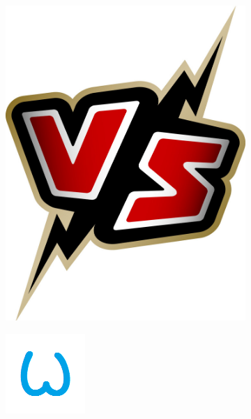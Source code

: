 \documentclass{beamer}
\begin{document}
\begin{frame}
\begin{minipage}{\textwidth}
\begin{figure}
\begin{subfigure}[b]{0.2\textwidth}
			\includegraphics[width=\textwidth]{versus.jpg}
			\label{fig:nodsdfsde_mcudf}
		\end{subfigure}
		\begin{subfigure}[b]{0.25\textwidth}
			\includegraphics[width=\textwidth]{WeMos.png}

\end{subfigure}
\end{figure}
\end{minipage}
\end{frame}
\end{document}
